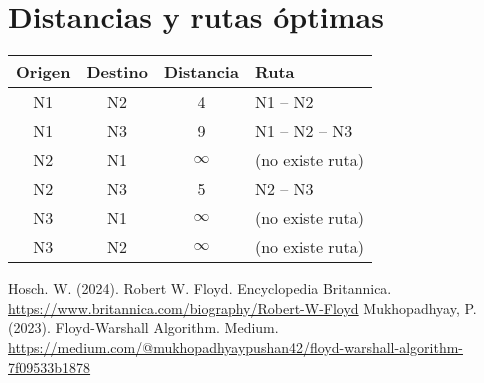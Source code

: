 \documentclass[a4paper,11pt]{article}
\begin{document}
\section*{Distancias y rutas \'optimas}
\begin{longtable}{c c c p{7cm}}
\hline
Origen & Destino & Distancia & Ruta \\\hline
\endhead
N1 & N2 & 4 & N1 -- N2 \\
N1 & N3 & 9 & N1 -- N2 -- N3 \\
N2 & N1 & $\infty$ & (no existe ruta) \\
N2 & N3 & 5 & N2 -- N3 \\
N3 & N1 & $\infty$ & (no existe ruta) \\
N3 & N2 & $\infty$ & (no existe ruta) \\
\hline
\end{longtable}
\renewcommand{\refname}{Referencias}
\begin{thebibliography}{9}
 Hosch. W. (2024). Robert W. Floyd. Encyclopedia Britannica. \\ \url{https://www.britannica.com/biography/Robert-W-Floyd}
 Mukhopadhyay, P. (2023). Floyd-Warshall Algorithm. Medium. \\ \url{https://medium.com/@mukhopadhyaypushan42/floyd-warshall-algorithm-7f09533b1878}
\end{thebibliography}
\end{document}
